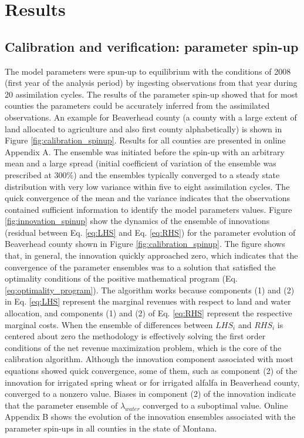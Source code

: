 \section{Results}

\subsection{Calibration and verification: parameter spin-up}



The model parameters were spun-up to equilibrium with the conditions of 2008 (first year of the analysis period) by ingesting observations from that year during 20 assimilation cycles. The results of the parameter spin-up showed that for most counties the parameters could be accurately inferred from the assimilated observations. An example for Beaverhead county (a county with a large extent of land allocated to agriculture and also first county alphabetically) is shown in Figure \ref{fig:calibration_spinup}. Results for all counties are presented in online Appendix A. The ensemble was initiated before the spin-up with an arbitrary mean and a large spread (initial coefficient of variation of the ensemble was prescribed at 300\%) and the ensembles typically converged to a steady state distribution with very low variance within five to eight assimilation cycles. The quick convergence of the mean and the variance indicates that the observations contained sufficient information to identify the model parameters values.  Figure \ref{fig:innovation_spinup} show the dynamics of the ensemble of innovations (residual between Eq. \eqref{eq:LHS} and Eq. \eqref{eq:RHS}) for the parameter evolution of Beaverhead county shown in Figure \ref{fig:calibration_spinup}. The figure shows that, in general, the innovation quickly approached zero, which indicates that the convergence of the parameter ensembles was to a solution that satisfied the optimality conditions of the positive mathematical program (Eq. \eqref{eq:optimality_program}). The algorithm works because components (1) and (2) in Eq. \eqref{eq:LHS} represent the marginal revenues with respect to land and water allocation, and components (1) and (2) of Eq. \eqref{eq:RHS} represent the respective marginal costs. When the ensemble of differences between $LHS_i$ and $RHS_i$ is centered about zero the methodology is effectively solving the first order conditions of the net revenue maximization problem, which is the core of the calibration algorithm. Although the innovation component associated with most equations showed quick convergence, some of them, such as component (2) of the innovation for irrigated spring wheat or for irrigated alfalfa in Beaverhead county, converged to a nonzero value. Biases in component (2) of the innovation indicate that the parameter ensemble of $\lambda_{water}$ converged to a suboptimal value. Online Appendix B shows the evolution of the innovation ensembles associated with the parameter spin-ups in all counties in the state of Montana.    


